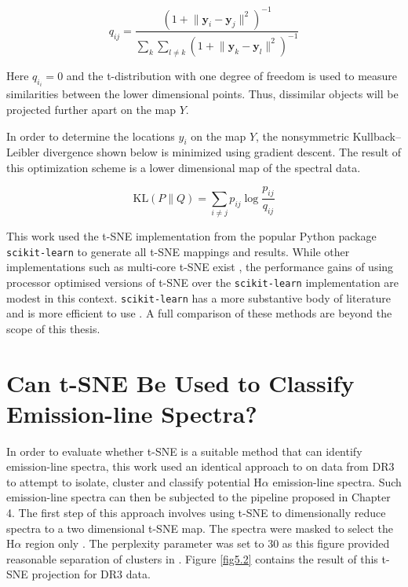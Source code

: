 \begin{equation}
    q_{ij}={\frac {(1+\lVert \mathbf {y} _{i}-\mathbf {y} _{j}\rVert ^{2})^{-1}}{\sum _{k}\sum _{l\neq k}(1+\lVert \mathbf {y} _{k}-\mathbf {y} _{l}\rVert ^{2})^{-1}}}
\end{equation}

Here $q_i_i=0$ and the t-distribution with one degree of freedom is used to measure similarities between the lower dimensional points. Thus, dissimilar objects will be projected further apart on the map $Y$.

In order to determine the locations $y_i$ on the map $Y$, the nonsymmetric Kullback–Leibler divergence shown below is minimized using gradient descent. The result of this optimization scheme is a lower dimensional map of the spectral data.

\begin{equation}
    \mathrm {KL} \left(P\parallel Q\right)=\sum _{i\neq j}p_{ij}\log {\frac {p_{ij}}{q_{ij}}}
\end{equation}

This work used the t-SNE implementation from the popular Python package \texttt{scikit-learn} to generate all t-SNE mappings and results. While other implementations such as multi-core t-SNE exist \citep{Ulyanov2016}, the performance gains of using processor optimised versions of t-SNE over the \texttt{scikit-learn} implementation are modest in this context. \texttt{scikit-learn} has a more substantive body of literature and is more efficient to use \citep{hackeling2017mastering}. A full comparison of these methods are beyond the scope of this thesis.

\section{Can t-SNE Be Used to Classify Emission-line Spectra?}

In order to evaluate whether t-SNE is a suitable method that can identify emission-line spectra, this work used an identical approach to \citet{traven2017galah} on data from DR3 to attempt to isolate, cluster and classify potential H$\alpha$ emission-line spectra. Such emission-line spectra can then be subjected to the pipeline proposed in Chapter 4. The first step of this approach involves using t-SNE to dimensionally reduce spectra to a two dimensional t-SNE map. The spectra were masked to select the H$\alpha$ region only \citep{traven2017galah}. The perplexity parameter was set to 30 as this figure provided reasonable separation of clusters in \citet{traven2017galah}. Figure \ref{fig5.2} contains the result of this t-SNE projection for DR3 data. 

